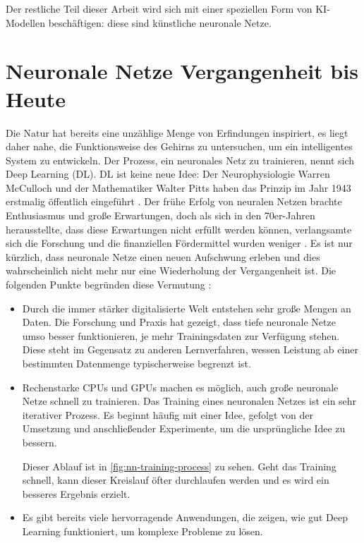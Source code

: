 \noindent
Der restliche Teil dieser Arbeit wird sich mit einer
speziellen Form von KI-Modellen beschäftigen: diese sind künstliche
neuronale Netze.

\section{Neuronale Netze Vergangenheit bis Heute}
Die Natur hat bereits eine unzählige Menge von Erfindungen
inspiriert, es liegt daher nahe, die Funktionsweise des Gehirns zu
untersuchen, um ein intelligentes System zu entwickeln.
Der Prozess, ein neuronales Netz zu trainieren, nennt sich Deep Learning (DL).
DL ist keine neue Idee:
Der Neurophysiologie Warren McCulloch und der Mathematiker Walter Pitts
haben das Prinzip im Jahr 1943 erstmalig öffentlich eingeführt
\parencite[280]{book:hands-on-ml}. Der frühe Erfolg von neuralen
Netzen brachte Enthusiasmus und große Erwartungen,
doch als sich in den 70er-Jahren herausstellte, dass diese Erwartungen nicht erfüllt
werden können, verlangsamte sich die Forschung und die finanziellen Fördermittel
wurden weniger \parencite[280]{book:hands-on-ml}.
Es ist nur kürzlich, dass neuronale Netze einen neuen Aufschwung erleben
und dies wahrscheinlich nicht mehr nur eine Wiederholung der Vergangenheit ist.
Die folgenden Punkte begründen diese Vermutung \parencite[280]{book:hands-on-ml}:
\begin{itemize}
  \item Durch die immer stärker digitalisierte Welt
        entstehen sehr große Mengen an Daten.
        Die Forschung und Praxis hat gezeigt, dass tiefe neuronale Netze umso besser funktionieren,
        je mehr Trainingsdaten zur Verfügung stehen. Diese steht im Gegensatz
        zu anderen Lernverfahren, wessen Leistung ab einer bestimmten
        Datenmenge typischerweise begrenzt ist.
  \item Rechenstarke CPUs und GPUs machen es möglich, auch große neuronale Netze
        schnell zu trainieren. Das Training eines neuronalen
        Netzes ist ein sehr iterativer Prozess.
        Es beginnt häufig mit einer Idee,
        gefolgt von der Umsetzung und anschließender Experimente, um die ursprüngliche
        Idee zu bessern.
        

        \noindent
        Dieser Ablauf ist in \autoref{fig:nn-training-process} zu sehen.
        Geht das Training schnell, kann dieser Kreislauf öfter durchlaufen
        werden und es wird ein besseres Ergebnis erzielt.
  \item Es gibt bereits viele hervorragende Anwendungen, die zeigen,
        wie gut Deep Learning funktioniert, um komplexe Probleme zu lösen.
\end{itemize}
